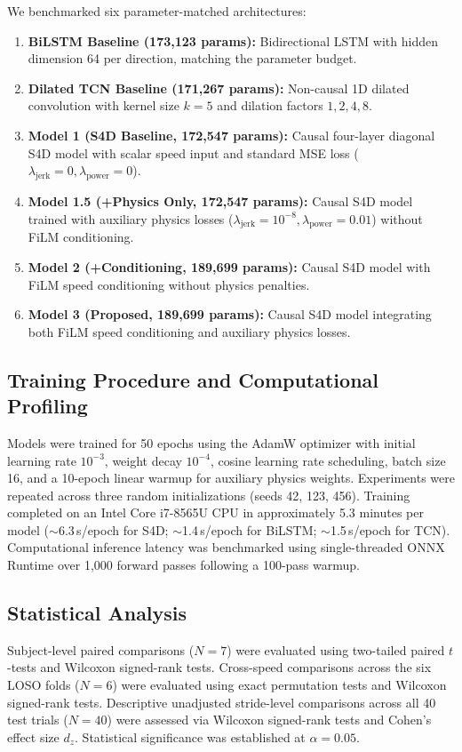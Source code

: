 \documentclass[fleqn,10pt]{wlscirep}
\newcommand{\lamjerk}{\lambda_{\mathrm{jerk}}}
\newcommand{\lampower}{\lambda_{\mathrm{power}}}
\begin{document}
We benchmarked six parameter-matched architectures:
\begin{enumerate}
\item \textbf{BiLSTM Baseline (173,123 params):} Bidirectional LSTM with hidden dimension 64 per direction, matching the parameter budget.
\item \textbf{Dilated TCN Baseline (171,267 params):} Non-causal 1D dilated convolution with kernel size $k=5$ and dilation factors $1, 2, 4, 8$.
\item \textbf{Model 1 (S4D Baseline, 172,547 params):} Causal four-layer diagonal S4D model with scalar speed input and standard MSE loss ($\lamjerk = 0, \lampower = 0$).
\item \textbf{Model 1.5 (+Physics Only, 172,547 params):} Causal S4D model trained with auxiliary physics losses ($\lamjerk = 10^{-8}, \lampower = 0.01$) without FiLM conditioning.
\item \textbf{Model 2 (+Conditioning, 189,699 params):} Causal S4D model with FiLM speed conditioning without physics penalties.
\item \textbf{Model 3 (Proposed, 189,699 params):} Causal S4D model integrating both FiLM speed conditioning and auxiliary physics losses.
\end{enumerate}

\subsection{Training Procedure and Computational Profiling}

Models were trained for 50 epochs using the AdamW optimizer with initial learning rate $10^{-3}$, weight decay $10^{-4}$, cosine learning rate scheduling, batch size 16, and a 10-epoch linear warmup for auxiliary physics weights. Experiments were repeated across three random initializations (seeds 42, 123, 456). Training completed on an Intel Core i7-8565U CPU in approximately 5.3 minutes per model ($\sim$6.3\,\si{\second}/epoch for S4D; $\sim$1.4\,\si{\second}/epoch for BiLSTM; $\sim$1.5\,\si{\second}/epoch for TCN). Computational inference latency was benchmarked using single-threaded ONNX Runtime over 1,000 forward passes following a 100-pass warmup.

\subsection{Statistical Analysis}

Subject-level paired comparisons ($N=7$) were evaluated using two-tailed paired $t$-tests and Wilcoxon signed-rank tests. Cross-speed comparisons across the six LOSO folds ($N=6$) were evaluated using exact permutation tests and Wilcoxon signed-rank tests. Descriptive unadjusted stride-level comparisons across all 40 test trials ($N=40$) were assessed via Wilcoxon signed-rank tests and Cohen's effect size $d_z$. Statistical significance was established at $\alpha = 0.05$.
\end{document}
